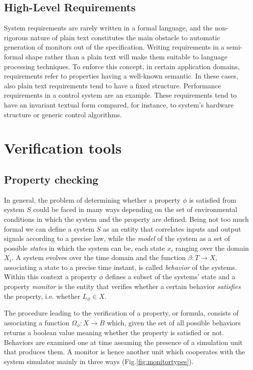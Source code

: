 \subsection{High-Level Requirements}
System requirements are rarely written in a formal language, and the non-rigorous nature of plain text constitutes the main obstacle to automatic generation of monitors out of the specification. Writing requirements in a semi-formal shape rather than a plain text will make them suitable to language processing techniques. To enforce this concept, in certain application domains, requirements refer to properties having a well-known semantic. In these cases, also plain text requirements tend to have a fixed structure. Performance requirements in a control system are an example. These requirements tend to have an invariant textual form compared, for instance, to system's hardware structure or generic control algorithms.
\newpage
\section{Verification tools}

\subsection{Property checking}

In general, the problem of determining whether a property $\phi$ is satisfied from system $S$ could be faced in many ways depending on the set of environmental conditions in which the system and the property are defined. Being not too much formal we can define a system $S$ as an entity that correlates inputs and output signals according to a precise law, while the \textit{model} of the system as a set of possible \textit{states} in which the system can be, each state $x_{i}$ ranging over the domain $X_{i}$. A system evolves over the time domain and the function $\beta :T\rightarrow X$, associating a state to a precise time instant, is called \textit{behavior} of the systems. 
Within this context a property $\phi$ defines a subset of the systems' state and a property \textit{monitor} is the entity that verifies whether a certain behavior \textit{satisfies} the property, i.e. whether $L_{\phi}\in X$.
\par The procedure leading to the verification of a property, or formula, consists of associating a function $\Omega_{\phi}:X\rightarrow B$ which, given the set of all possible behaviors returns a boolean value meaning whether the property is satisfied or not. Behaviors are examined one at time assuming the presence of a simulation unit that produces them. 
A monitor is hence another unit which cooperates with the system simulator mainly in three ways (Fig.\ref{fig:monitortypes}). 

